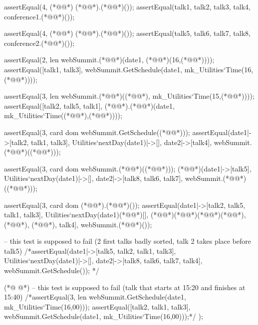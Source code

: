 \begin{vdmpp}[breaklines=true]
  assertEqual(4, (*@@*) (*@@*).(*@@*)());
  assertEqual({talk1, talk2, talk3, talk4}, conference1.(*@@*)());
  
  assertEqual(4, (*@@*) (*@@*).(*@@*)());
  assertEqual({talk5, talk6, talk7, talk8}, conference2.(*@@*)());
  
  assertEqual(2, len webSummit.(*@@*)(date1, (*@@*)(16,(*@@*))));
  assertEqual([talk1, talk3], webSummit.GetSchedule(date1, mk_Utilities`Time(16,(*@@*))));
  
  assertEqual(3, len webSummit.(*@@*)((*@@*), mk_Utilities`Time(15,(*@@*))));
  assertEqual([talk2, talk5, talk1], (*@@*).(*@@*)(date1, mk_Utilities`Time((*@@*),(*@@*))));
  
  assertEqual(3, card dom webSummit.GetSchedule((*@@*)));
  assertEqual({date1|->[talk2, talk1, talk3], Utilities`nextDay(date1)|->[], date2|->[talk4]}, webSummit.(*@@*)((*@@*)));
  
  assertEqual(3, card dom webSummit.(*@@*)((*@@*)));
  (*@@*)({date1|->[talk5], Utilities`nextDay(date1)|->[], date2|->[talk8, talk6, talk7]}, webSummit.(*@@*)((*@@*)));
  
  assertEqual(3, card dom (*@@*).(*@@*)());
  assertEqual({date1|->[talk2, talk5, talk1, talk3], Utilities`nextDay(date1)(*@\vdmnotcovered{|->}@*)[], (*@@*)(*@\vdmnotcovered{|->}@*)(*@\vdmnotcovered{[}@*)(*@@*), (*@@*), (*@@*), talk4]}, webSummit.(*@@*)());
  
  -- this test is supposed to fail (2 first talks badly sorted, talk 2 takes place before talk5)
  /*assertEqual({date1|->[talk5, talk2, talk1, talk3], Utilities`nextDay(date1)|->[], date2|->[talk8, talk6, talk7, talk4]}, webSummit.GetSchedule());
  */
  
(*@
\label{testCreateAndAddCompany:243}
@*)
  -- this test is supposed to fail (talk that starts at 15:20 and finishes at 15:40)
  /*assertEqual(3, len webSummit.GetSchedule(date1, mk_Utilities`Time(16,00)));
   assertEqual([talk2, talk1, talk3], webSummit.GetSchedule(date1, mk_Utilities`Time(16,00)));*/
 );
 

\end{vdmpp}
